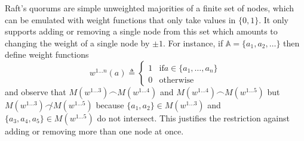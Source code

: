 \documentclass[journal]{IEEEtran}
\begin{document}
\def\wl#1{w^{1 \ldots #1}}
\def\Mwl#1{M(\wl{#1})}

Raft's quorums are simple unweighted majorities of a finite set of nodes, which
can be emulated with weight functions that only take values in $\{0, 1\}$. It
only supports adding or removing a single node from this set which amounts to
changing the weight of a single node by $\pm 1$. For instance, if $\mathbb A =
\{ a_1, a_2, \ldots \}$ then define weight functions \[\wl{n}(a) \triangleq
\begin{cases} 1 & \mathrm{if } a \in \{a_1, \ldots, a_n\} \\ 0 &
\mathrm{otherwise}\end{cases}\] and observe that ${\Mwl{3} \frown \Mwl{4}}$ and
${\Mwl{4} \frown \Mwl{5}}$ but ${\Mwl{3} \not\frown \Mwl{5}}$ because $\{a_1,
a_2\} \in \Mwl{3}$ and $\{a_3, a_4, a_5\} \in \Mwl{5}$ do not intersect. This
justifies the restriction against adding or removing more than one node at
once.
\end{document}
